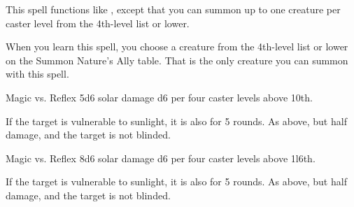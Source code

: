 \begin{spellheader}
    \spelldur{\durshort \dismissable}
\end{spellheader}
\begin{spelleffects}
    \spelleffect This spell functions like , except that you can summon up to one creature per caster level from the 4th-level list or lower.
    \par When you learn this spell, you choose a creature from the 4th-level list or lower on the Summon Nature's Ally table. That is the only creature you can summon with this spell.
\end{spelleffects}
\begin{spellfooter}

\end{spellfooter}

\begin{spellheader}
\end{spellheader}
\begin{spelleffects}
    \begin{spellattack}{Magic vs. Reflex}
        \spellsuccess 5d6 solar damage \add d6 per four caster levels above 10th.

        If the target is vulnerable to sunlight, it is also \blinded for 5 rounds.
        \spellfailure As above, but half damage, and the target is not blinded.
    \end{spellattack}
\end{spelleffects}
\begin{spellfooter}

\end{spellfooter}

\begin{spellheader}
\end{spellheader}
\begin{spelleffects}
    \begin{spellattack}{Magic vs. Reflex}
        \spellsuccess 8d6 solar damage \add d6 per four caster levels above 1l6th.

        If the target is vulnerable to sunlight, it is also \blinded for 5 rounds.
        \spellfailure As above, but half damage, and the target is not blinded.
    \end{spellattack}
\end{spelleffects}
\begin{spellfooter}

\end{spellfooter}

